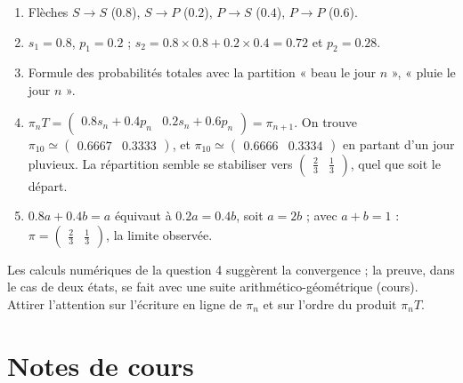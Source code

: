 \begin{solution}[Activité]
\begin{enumerate}
\item Flèches $S\to S$ ($\num{0,8}$), $S\to P$ ($\num{0,2}$), $P\to S$ ($\num{0,4}$), $P\to P$ ($\num{0,6}$).
\item $s_1=\num{0,8}$, $p_1=\num{0,2}$ ; $s_2=\num{0,8}\times\num{0,8}+\num{0,2}\times\num{0,4}=\num{0,72}$ et $p_2=\num{0,28}$.
\item Formule des probabilités totales avec la partition « beau le jour $n$ », « pluie le jour $n$ ».
\item $\pi_nT=\begin{pmatrix}\num{0,8}s_n+\num{0,4}p_n&\num{0,2}s_n+\num{0,6}p_n\end{pmatrix}=\pi_{n+1}$. On trouve $\pi_{10}\simeq\begin{pmatrix}\num{0,6667}&\num{0,3333}\end{pmatrix}$, et $\pi_{10}\simeq\begin{pmatrix}\num{0,6666}&\num{0,3334}\end{pmatrix}$ en partant d'un jour pluvieux. La répartition semble se stabiliser vers $\begin{pmatrix}\frac23&\frac13\end{pmatrix}$, quel que soit le départ.
\item $\num{0,8}a+\num{0,4}b=a$ équivaut à $\num{0,2}a=\num{0,4}b$, soit $a=2b$ ; avec $a+b=1$ : $\pi=\begin{pmatrix}\frac23&\frac13\end{pmatrix}$, la limite observée.
\end{enumerate}
\end{solution}
\begin{teachernote}
Les calculs numériques de la question 4 suggèrent la convergence ; la preuve, dans le cas de deux états, se fait avec une suite arithmético-géométrique (cours). Attirer l'attention sur l'écriture en ligne de $\pi_n$ et sur l'ordre du produit $\pi_nT$.
\end{teachernote}

\mxnewpage
\section{Notes de cours}
